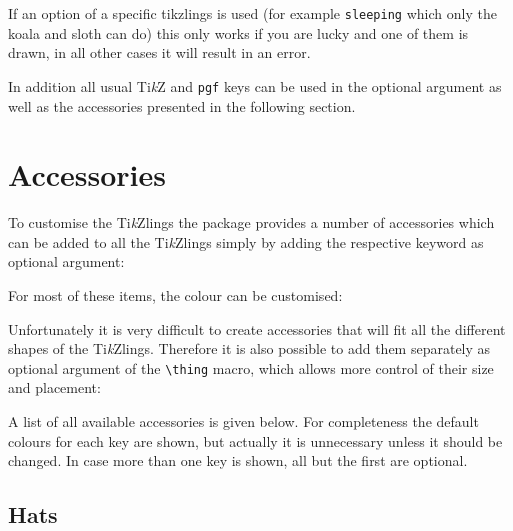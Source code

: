 \documentclass[parskip=half]{scrartcl}
\newcommand{\TikZ}{Ti\emph{k}Z\xspace}
\newcommand{\tikzlings}{Ti\emph{k}Zlings\xspace}
\begin{document}
If an option of a specific tikzlings is used (for example \lstinline|sleeping| which only the koala and sloth can do) this only works if you are lucky and one of them is drawn, in all other cases it will result in an error. 

In addition all usual \TikZ and \lstinline|pgf| keys can be used in the optional argument as well as the accessories presented in the following section.

%
%
\clearpage
\section{Accessories}

To customise the \tikzlings the package provides a number of accessories which can be added to all the \tikzlings simply by adding the respective keyword as optional argument:

\begin{tcblisting}{}
\bear[hat]
\end{tcblisting}
 
For most of these items, the colour can be customised:

\begin{tcblisting}{}
\koala[crown=orange!50!yellow]
\end{tcblisting}

Unfortunately it is very difficult to create accessories that will fit all the different shapes of the \tikzlings. Therefore it is also possible to add them separately as optional argument of the \lstinline|\thing| macro, which allows more control of their size and placement:

\begin{tcblisting}{}
\owl
\thing[tophat,scale=1.5,yshift=-0.6cm,xshift=-0.05cm]
\end{tcblisting}

A list of all available accessories is given below. For completeness the default colours for each key are shown, but actually it is unnecessary unless it should be changed. In case more than one key is shown, all but the first are optional.

\subsection{Hats}

\begin{tcblisting}{}
\penguin[
  hat=blue!40!black
]
\end{tcblisting}
\end{document}

